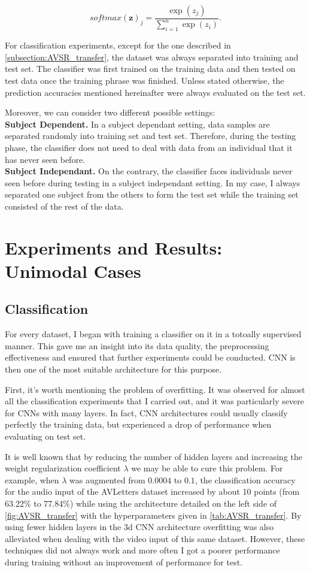 \[softmax(\mathbf{z})_j = \frac{\exp(z_j)}{\sum_{i=1}^n\exp(z_i)}.\]

For classification experiments, except for the one described in
\ref{subsection:AVSR_transfer}, the dataset was always separated into
training and test set. The classifier was first trained on the training data
and then tested on test data once the training phrase was finished.
Unless stated otherwise, the prediction accuracies mentioned hereinafter
were always evaluated on the test set.

Moreover, we can consider two different possible settings:\\[0.25em]
\textbf{Subject Dependent.}
In a subject dependant setting, data samples are separated randomly into
training set and test set. Therefore, during the
testing phase, the classifier does not need to deal with data from an
individual that it has never seen before.\\[0.25em]
\textbf{Subject Independant.}
On the contrary, the classifier faces individuals never seen before
during testing in a subject independant setting. 
In my case, I always separated one subject from the others to form
the test set while the training set consisted of the rest of the data.

\section{Experiments and Results: Unimodal Cases} \label{section:uni}

\subsection{Classification} \label{subsection:classif}

For every dataset, I began with training a classifier on it in a
totoally supervised manner.
This gave me an insight into its data quality, the preprocessing
effectiveness and ensured that further experiments could be conducted.
CNN is then one of the most suitable architecture for this purpose.

First, it's worth mentioning the problem of overfitting.
It was observed for almost all the classification experiments that I
carried out, and it was particularly severe for CNNs with many layers.
In fact, CNN architectures could usually classify
perfectly the training data, but experienced a drop of performance
when evaluating on test set.

It is well known that by reducing the number of hidden layers and
increasing the weight regularization coefficient $\lambda$ we may
be able to cure this problem.
For example, when $\lambda$ was augmented from $0.0004$ to $0.1$,
the classification accuracy for the audio input of the AVLetters
dataset increased by about 10 points
(from 63.22\% to 77.84\%) while using the architecture detailed on
the left side of \autoref{fig:AVSR_transfer} with the hyperparameters
given in \autoref{tab:AVSR_transfer}.
By using fewer hidden layers in the 3d CNN architecture overfitting
was also alleviated when dealing with the video input of this same dataset.
However, these techniques did not always work
and more often I got a poorer performance during training without
an improvement of performance for test.

